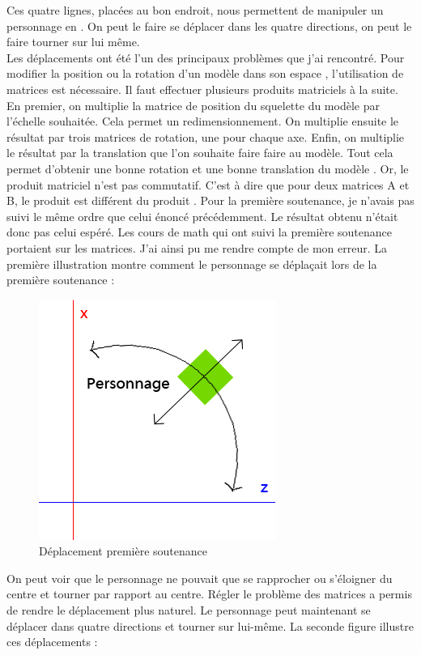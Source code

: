 \documentclass{article}
\begin{document}
Ces quatre lignes, placées au bon endroit, nous permettent de manipuler un personnage en . On peut le faire se déplacer dans les quatre directions, on peut le faire tourner sur lui même.\\

Les déplacements ont été l'un des principaux problèmes que j'ai rencontré. Pour modifier la position ou la rotation d'un modèle dans son espace , l'utilisation de matrices est nécessaire. Il faut effectuer plusieurs produits matriciels à la suite. En premier, on multiplie la matrice de position du squelette du modèle par l'échelle souhaitée. Cela permet un redimensionnement. On multiplie ensuite le résultat par trois matrices de rotation, une pour chaque axe. Enfin, on multiplie le résultat par la translation que l'on souhaite faire faire au modèle. Tout cela permet d'obtenir une bonne rotation et une bonne translation du modèle . 
Or, le produit matriciel n'est pas commutatif. C'est à dire que pour deux matrices A et B, le produit  est différent du produit . Pour la première soutenance, je n'avais pas suivi le même ordre que celui énoncé précédemment. Le résultat obtenu n'était donc pas celui espéré. Les cours de math qui ont suivi la première soutenance portaient sur les matrices. J'ai ainsi pu me rendre compte de mon erreur. La première illustration montre comment le personnage se déplaçait lors de la première soutenance : 

\begin{figure}[h]
\begin{center}
\includegraphics[scale=0.5]{deplac1.jpg}
\caption{Déplacement première soutenance}
\end{center}
\end{figure}
On peut voir que le personnage ne pouvait que se rapprocher ou s'éloigner du centre et tourner par rapport au centre. Régler le problème des matrices a permis de rendre le déplacement plus naturel. Le personnage peut maintenant se déplacer dans quatre directions et tourner sur lui-même. La seconde figure illustre ces déplacements : 
\end{document}
